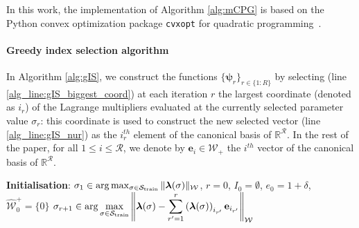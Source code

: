 In this work, the implementation of Algorithm \ref{alg:mCPG} is based on the Python convex optimization package \texttt{cvxopt} for quadratic programming~\cite{andersen2020cvxopt}.
\paragraph{Greedy index selection algorithm}
In Algorithm \ref{alg:gIS}, we construct the functions $\{\boldsymbol{\psi}_r\}_{r\in\{1:R\}}$ by selecting (line \ref{alg_line:gIS_biggest_coord}) at each iteration $r$ the largest coordinate (denoted as $i_r$) of the Lagrange multipliers evaluated at the currently selected parameter value $\sigma_r$: this coordinate is used to construct the new selected vector (line \ref{alg_line:gIS_nur}) as the $i_r^{th}$ element of the canonical basis of $\mathbb{R}^{\mathcal R}$. In the rest of the paper, for all $1\leq i \leq \mathcal R$, we denote by $\mathbf{e}_i \in \mathcal W_+$ the $i^{th}$ vector of the canonical basis of $\mathbb{R}^\mathcal{R}$. 
\begin{algorithm}[h]
\caption{Greedy index selection (gIS)}\label{alg:gIS}
\begin{algorithmic}[1]
\STATE \textbf{Initialisation}: $\sigma_1 \in \arg \max_{\sigma \in \mathcal S_{\rm train}} \|\boldsymbol{\lambda}(\sigma)\|_{\mathcal{W}}$, $r=0$, $I_{0}=\emptyset$,  $e_0=1+\delta$, $\hat{\mathcal{W}}_0^+=\{0\}$
 \label{alg_line:gIS_biggest_coord}
	 \label{alg_line:gIS_nur}
	\STATE $\displaystyle \sigma_{r+1}\in {\rm{arg}} \max_{\sigma \in \mathcal S_{\rm train}} \left\|\boldsymbol{\lambda} (\sigma) - \sum_{r'=1}^r \left(\boldsymbol{\lambda} (\sigma)\right)_{i_{r'}} \mathbf{e}_{i_{r'}}\right\|_{\mathcal{W}}$
 \label{alg_line:gIS_max_par}
 \label{alg_line:gIS_max_err}
\ENDWHILE
{}
	\end{algorithmic}
  \end{algorithm}
  
